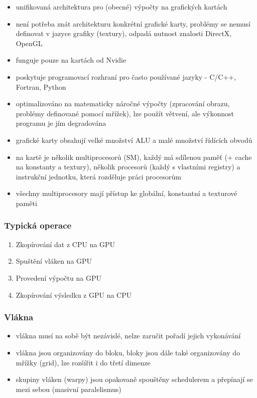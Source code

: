 \documentclass[10pt,a4paper]{article}
\begin{document}
\begin{itemize}
\item unifikovaná architektura pro (obecné) výpočty na grafických kartách
\item není potřeba znát architekturu konkrétní grafické karty, problémy se nemusí definovat v jazyce grafiky (textury), odpadá nutnost znalosti DirectX, OpenGL
\item funguje pouze na kartách od Nvidie
\item poskytuje programovací rozhraní pro často používané jazyky - C/C++, Fortran, Python
\item optimalizováno na matematicky náročné výpočty (zpracování obrazu, problémy definované pomocí mřížek), lze použít větvení, ale výkonnost programu je jím degradována
\item grafické karty obsahují velké množství ALU a malé množství řídících obvodů
\item na kartě je několik multiprocesorů (SM), každý má sdílenou paměť (+ cache na konstanty a textury), několik procesorů (každý s vlastními registry) a instrukční jednotku, která rozděluje práci procesorům
\item všechny multiprocesory mají přístup ke globální, konstantní a texturové paměti
\end{itemize}

\subsubsection{Typická operace}

\begin{enumerate}
\item Zkopírování dat z CPU na GPU
\item Spuštění vláken na GPU
\item Provedení výpočtu na GPU
\item Zkopírování výsledku z GPU na CPU
\end{enumerate}

\subsubsection{Vlákna}

\begin{itemize}
\item vlákna musí na sobě být nezávislé, nelze zaručit pořadí jejich vykonávání
\item vlákna jsou organizovány do bloku, bloky jsou dále také organizovány do mřížky (grid), lze rozšířit i do třetí dimenze
\item skupiny vláken (warpy) jsou opakovaně spouštěny schedulerem a přepínají se mezi sebou (masivní paralelismus)
\end{itemize}
\end{document}
